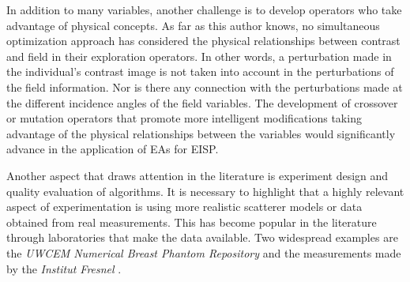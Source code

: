 		In addition to many variables, another challenge is to develop operators who take advantage of physical concepts. As far as this author knows, no simultaneous optimization approach has considered the physical relationships between contrast and field in their exploration operators. In other words, a perturbation made in the individual's contrast image is not taken into account in the perturbations of the field information. Nor is there any connection with the perturbations made at the different incidence angles of the field variables. The development of crossover or mutation operators that promote more intelligent modifications taking advantage of the physical relationships between the variables would significantly advance in the application of EAs for EISP.
		
		Another aspect that draws attention in the literature is experiment design and quality evaluation of algorithms. It is necessary to highlight that a highly relevant aspect of experimentation is using more realistic scatterer models or data obtained from real measurements. This has become popular in the literature through laboratories that make the data available. Two widespread examples are the \textit{UWCEM Numerical Breast Phantom Repository} \citep{burfeindt2012mri}  and the measurements made by the \textit{Institut Fresnel} \citep{geffrin2005free}.
		
